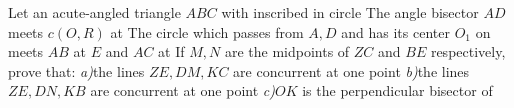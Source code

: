 Let an acute-angled triangle $ABC$ with  inscribed in circle  The angle bisector $AD$ meets $c(O,R)$ at  The circle which passes from $A,D$ and has its center $O_1$ on  meets $AB$ at $E$ and $AC$ at  If $M,N$ are the midpoints of $ZC$ and $BE$ respectively, prove that:
\textit{a)}the lines $ZE,DM,KC$ are concurrent at one point 
\textit{b)}the lines $ZE,DN,KB$ are concurrent at one point 
\textit{c)}$OK$ is the perpendicular bisector of 